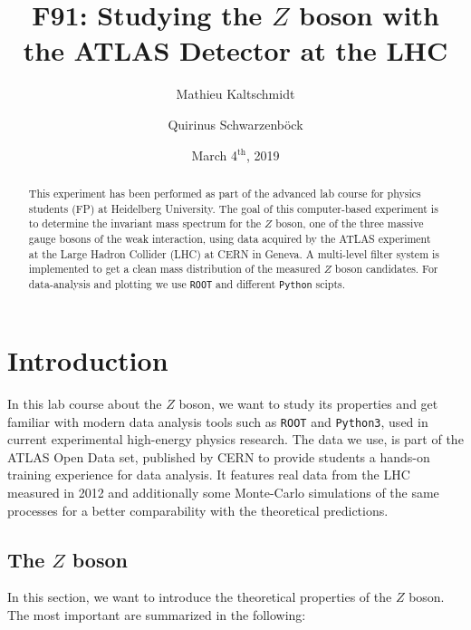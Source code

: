 \documentclass[twocolumn,
			   showpacs,%
               nofootinbib,
               aps,%
               prd,
               notitlepage,
               showkeys,
               10pt]{revtex4-1}
\begin{document}
{\hypersetup{allcolors=black}
\title{F91: Studying the $Z$ boson with the ATLAS Detector at the LHC }
\author{Mathieu Kaltschmidt}
\author{Quirinus Schwarzenb\"ock}

\date[Carried out in the week of  ]{March 4$^{\text{th}}$, 2019}


\begin{abstract}
This experiment has been performed as part of the advanced lab course for physics students (FP) at Heidelberg University.
The goal of this computer-based experiment is to determine the invariant mass spectrum for the $Z$ boson, one of the three massive gauge bosons of the weak interaction, using data acquired by the ATLAS experiment at the Large Hadron Collider (LHC) at CERN in Geneva.  A multi-level filter system is implemented to get a clean mass distribution of the measured $Z$ boson candidates. For data-analysis  and plotting we use \verb|ROOT| and different \verb|Python| scipts.
\end{abstract}

\maketitle


}
\section{Introduction}
In this lab course about the $Z$ boson, we want to study its properties and get familiar with modern data analysis tools such as \verb|ROOT| and \verb|Python3|, used in current experimental high-energy physics research. The data we use, is part of the ATLAS Open Data set, published by CERN to provide students a hands-on training experience for data analysis. It features real data from the LHC measured in 2012 and additionally some Monte-Carlo simulations of the same processes for a better comparability with the theoretical predictions.

\subsection{The $Z$ boson}
In this section, we want to introduce the theoretical properties of the $Z$ boson. The most important are summarized in the following:
\end{document}
